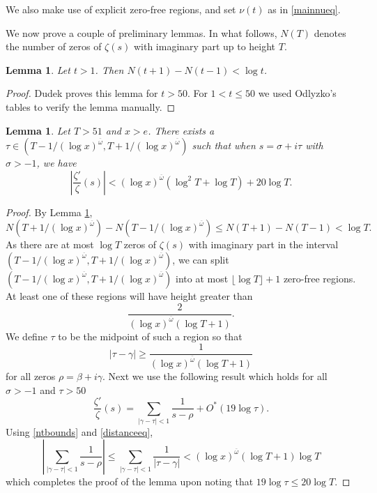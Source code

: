 \documentclass[reqno]{amsart}
\newtheorem{lemma}[theorem]{Lemma}
\numberwithin{equation}{section}
\theoremstyle{remark}
\begin{document}
We also make use of explicit zero-free regions, and set $\nu(t)$ as in \eqref{mainnueq}.

We now prove a couple of preliminary lemmas. In what follows, $N(T)$ denotes the number of zeros of $\zeta(s)$ with imaginary part up to height $T$.

\begin{lemma}\label{plus1minus1lem}
    Let $t>1$. Then $N(t+1)-N(t-1)<\log t$.
\end{lemma}
\begin{proof}
    Dudek \cite[Lemma 2.6]{Dudek_16p} proves this lemma for $t>50$. For $1<t\leq 50$ we used Odlyzko's tables \cite{odlyzkotable} to verify the lemma manually. 
\end{proof}

\begin{lemma}\label{djslem}
    Let $T>51$ and $x>e$. There exists a $\tau\in(T-1/(\log x)^{\overline{\omega}},T+1/(\log x)^{\overline{\omega}})$ such that when $s=\sigma+i\tau$ with $\sigma>-1$, we have
    \begin{equation*}
        \left|\frac{\zeta'}{\zeta}(s)\right|<(\log x)^{\overline{\omega}}(\log^2T+\log T)+20\log T.
    \end{equation*}
\end{lemma}
\begin{proof}
    By Lemma \ref{plus1minus1lem},
    \begin{equation}\label{ntbounds}
        N(T+1/(\log x)^{\overline{\omega}})-N(T-1/(\log x)^{\overline{\omega}})\leq N(T+1)-N(T-1)<\log T.   
    \end{equation}
    As there are at most $\log T$ zeros of $\zeta(s)$ with imaginary part in the interval $(T-1/(\log x)^{\overline{\omega}},T+1/(\log x)^{\overline{\omega}})$, we can split $(T-1/(\log x)^{\overline{\omega}},T+1/(\log x)^{\overline{\omega}})$ into at most $\lfloor\log T\rfloor+1$ zero-free regions. At least one of these regions will have height greater than 
    \begin{equation*}
        \frac{2}{(\log x)^{\overline{\omega}}(\log T+1)}.
    \end{equation*}
    We define $\tau$ to be the midpoint of such a region so that 
    \begin{equation}\label{distanceeq}
       |\tau-\gamma| \geq\frac{1}{(\log x)^{\overline{\omega}}(\log T+1)} 
    \end{equation}
    for all zeros $\rho=\beta+i\gamma$. Next we use the following result which holds for all $\sigma>-1$ and $\tau>50$ \cite[p. 187]{Dudek_16p}
    \begin{equation}\label{logderbound}
        \frac{\zeta'}{\zeta}(s)=\sum_{|\gamma-\tau|<1}\frac{1}{s-\rho}+O^*(19\log \tau).
    \end{equation}
    Using \eqref{ntbounds} and \eqref{distanceeq},
    \begin{equation*}
        \left|\sum_{|\gamma-\tau|<1}\frac{1}{s-\rho}\right|\leq\sum_{|\gamma-\tau|<1}\frac{1}{|\tau-\gamma|}<(\log x)^{\overline{\omega}}(\log T+1)\log T
    \end{equation*}
    which completes the proof of the lemma upon noting that $19\log\tau\leq 20\log T$.
\end{proof}
\end{document}
